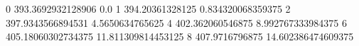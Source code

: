 0 393.3692932128906 0.0
1 394.20361328125 0.834320068359375
2 397.9343566894531 4.5650634765625
4 402.362060546875 8.992767333984375
6 405.18060302734375 11.811309814453125
8 407.9716796875 14.602386474609375
